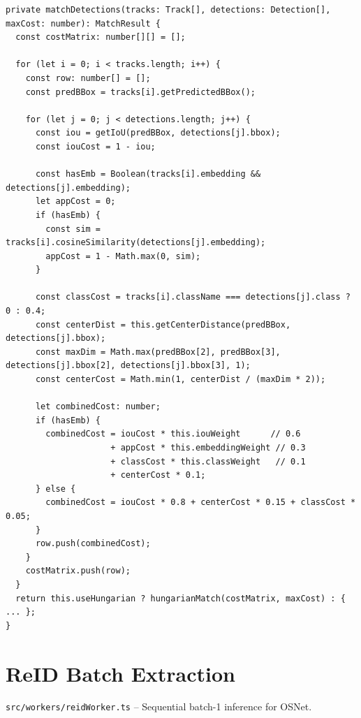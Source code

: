 \begin{lstlisting}[style=typescript, caption={matchDetections() cost computation}, label={lst:cost-matrix}]
private matchDetections(tracks: Track[], detections: Detection[], maxCost: number): MatchResult {
  const costMatrix: number[][] = [];

  for (let i = 0; i < tracks.length; i++) {
    const row: number[] = [];
    const predBBox = tracks[i].getPredictedBBox();

    for (let j = 0; j < detections.length; j++) {
      const iou = getIoU(predBBox, detections[j].bbox);
      const iouCost = 1 - iou;

      const hasEmb = Boolean(tracks[i].embedding && detections[j].embedding);
      let appCost = 0;
      if (hasEmb) {
        const sim = tracks[i].cosineSimilarity(detections[j].embedding);
        appCost = 1 - Math.max(0, sim);
      }

      const classCost = tracks[i].className === detections[j].class ? 0 : 0.4;
      const centerDist = this.getCenterDistance(predBBox, detections[j].bbox);
      const maxDim = Math.max(predBBox[2], predBBox[3], detections[j].bbox[2], detections[j].bbox[3], 1);
      const centerCost = Math.min(1, centerDist / (maxDim * 2));

      let combinedCost: number;
      if (hasEmb) {
        combinedCost = iouCost * this.iouWeight      // 0.6
                     + appCost * this.embeddingWeight // 0.3
                     + classCost * this.classWeight   // 0.1
                     + centerCost * 0.1;
      } else {
        combinedCost = iouCost * 0.8 + centerCost * 0.15 + classCost * 0.05;
      }
      row.push(combinedCost);
    }
    costMatrix.push(row);
  }
  return this.useHungarian ? hungarianMatch(costMatrix, maxCost) : { ... };
}
\end{lstlisting}

\section{ReID Batch Extraction}
\label{sec:code-reid}
\texttt{src/workers/reidWorker.ts} -- Sequential batch-1 inference for OSNet.

